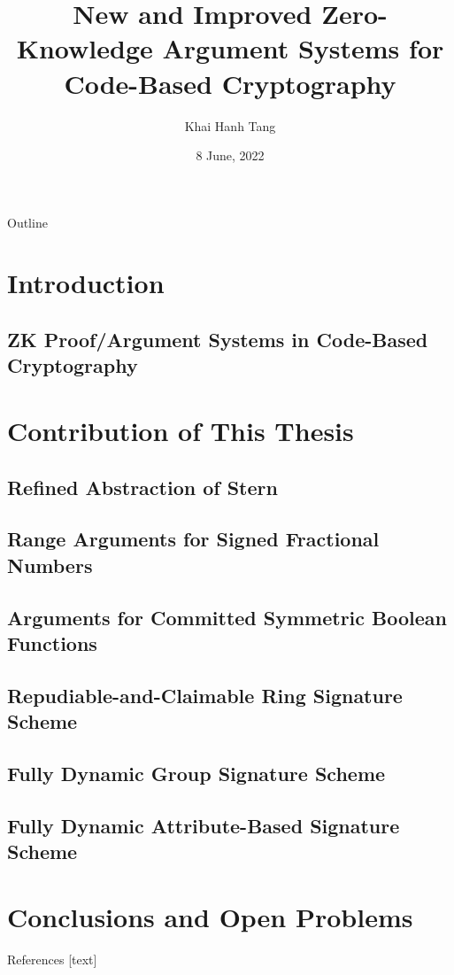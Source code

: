 \documentclass{beamer}
\title{New and Improved Zero-Knowledge Argument Systems for Code-Based Cryptography}
\author{Khai Hanh Tang}
\date{8 June, 2022}
\begin{document}
	
	\begin{frame}
		\titlepage
	\end{frame}
	
	\begin{frame}{Outline}
		\tableofcontents
		
	\end{frame}
	
	\section{Introduction}
	\subsection{ZK Proof/Argument Systems in Code-Based Cryptography}
	
	\section{Contribution of This Thesis}
	\subsection{Refined Abstraction of Stern}
	
	\subsection{Range Arguments for Signed Fractional Numbers}
	
	\subsection{Arguments for Committed Symmetric Boolean Functions}
	
	\subsection{Repudiable-and-Claimable Ring Signature Scheme}
	
	\subsection{Fully Dynamic Group Signature Scheme}
	
	\subsection{Fully Dynamic Attribute-Based Signature Scheme}
	
	\section{Conclusions and Open Problems}
	
	
	
	\begin{frame}[allowframebreaks]{References}
		
		
		
	\end{frame}
	
\end{document}
